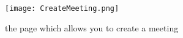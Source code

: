 \documentclass[11pt]{article}
\begin{document}
	\begin{figure}
		\centering
		\texttt{[image: CreateMeeting.png]}
		\caption{the page which allows you to create a meeting}
		\label{fig:createmeeting}
	\end{figure}
\end{document}
